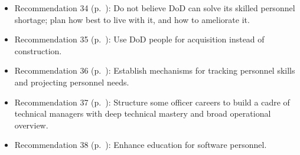 \documentclass[12pt,final]{article}
\begin{document}
\begin{itemize}
    \item Recommendation 34 (p.~\pageref{rec:34}): Do not believe DoD can solve its skilled personnel shortage; plan how best to live with it, and how to ameliorate it.
    \item Recommendation 35 (p.~\pageref{rec:35}): Use DoD people for acquisition instead of construction.
    \item Recommendation 36 (p.~\pageref{rec:36}): Establish mechanisms for tracking personnel skills and projecting personnel needs.
    \item Recommendation 37 (p.~\pageref{rec:37}): Structure some officer careers to build a cadre of technical managers with deep technical mastery and broad operational overview.
    \item Recommendation 38 (p.~\pageref{rec:38}): Enhance education for software personnel.
\end{itemize}
\end{document}
